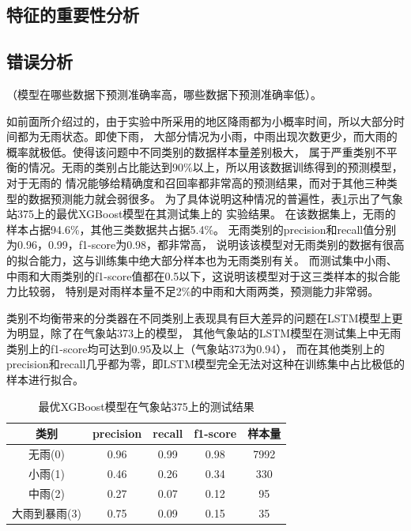 \documentclass[UTF8]{ctexart}
\begin{document}
\subsection{特征的重要性分析}

\subsection{错误分析}
（模型在哪些数据下预测准确率高，哪些数据下预测准确率低）。

如前面所介绍过的，由于实验中所采用的地区降雨都为小概率时间，所以大部分时间都为无雨状态。即使下雨，
大部分情况为小雨，中雨出现次数更少，而大雨的概率就极低。使得该问题中不同类别的数据样本量差别极大，
属于严重类别不平衡的情况。无雨的类别占比能达到90\%以上，所以用该数据训练得到的预测模型，对于无雨的
情况能够给精确度和召回率都非常高的预测结果，而对于其他三种类型的数据预测能力就会弱很多。
为了具体说明这种情况的普遍性，表\ref{tab:xgb-375}示出了气象站375上的最优XGBoost模型在其测试集上的
实验结果。
在该数据集上，无雨的样本占据94.6\%，其他三类数据共占据5.4\%。
无雨类别的precision和recall值分别为0.96，0.99，f1-score为0.98，都非常高，
说明该该模型对无雨类别的数据有很高的拟合能力，这与训练集中绝大部分样本也为无雨类别有关。
而测试集中小雨、中雨和大雨类别的f1-score值都在0.5以下，这说明该模型对于这三类样本的拟合能力比较弱，
特别是对雨样本量不足2\%的中雨和大雨两类，预测能力非常弱。

类别不均衡带来的分类器在不同类别上表现具有巨大差异的问题在LSTM模型上更为明显，除了在气象站373上的模型，
其他气象站的LSTM模型在测试集上中无雨类别上的f1-score均可达到0.95及以上（气象站373为0.94），
而在其他类别上的precision和recall几乎都为零，即LSTM模型完全无法对这种在训练集中占比极低的样本进行拟合。


\begin{table}[htb]
  \centering
  \begin{minipage}[t]{\linewidth}
  \centering
  \caption{最优XGBoost模型在气象站375上的测试结果}
  \label{tab:xgb-375}
    \begin{tabular}{ccccc}
      \toprule[1pt]
      类别 & precision & recall & f1-score & 样本量\\
      \midrule[0.5pt]
      无雨(0) & 0.96 & 0.99 & 0.98 & 7992\\
      小雨(1) & 0.46 & 0.26 & 0.34 & 330 \\
      中雨(2) & 0.27 & 0.07 & 0.12 & 95 \\
      大雨到暴雨(3) & 0.75 & 0.09 & 0.15 & 35\\
      \bottomrule[1pt]
    \end{tabular}
  \end{minipage}
\end{table}
\end{document}
